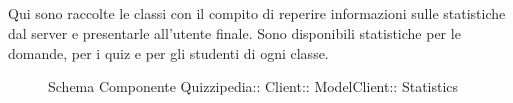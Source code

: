 \subsection{}
Qui sono raccolte le classi con il compito di reperire informazioni sulle statistiche dal server e presentarle all'utente finale. Sono disponibili statistiche per le domande, per i quiz e per gli studenti di ogni classe.
\begin{figure}[H]
\centering
\noindent{}
\caption[Schema Componente Statistics]{Schema Componente Quizzipedia:: Client:: ModelClient:: Statistics}
\end{figure}

